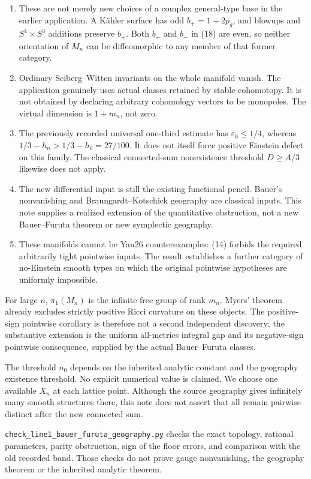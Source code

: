 \documentclass[
  11pt,
]{article}
\providecommand{\tightlist}{%
  \setlength{\itemsep}{0pt}\setlength{\parskip}{0pt}}
\begin{document}
\begin{enumerate}
\def\labelenumi{\arabic{enumi}.}
\tightlist
\item
  These are not merely new choices of a complex general-type base in the
  earlier application. A Kähler surface has odd \(b_+=1+2p_g\), and
  blowups and \(S^1\times S^3\) additions preserve \(b_+\). Both \(b_+\)
  and \(b_-\) in (18) are even, so neither orientation of \(M_n\) can be
  diffeomorphic to any member of that former category.
\item
  Ordinary Seiberg--Witten invariants on the whole manifold vanish. The
  application genuinely uses actual classes retained by stable
  cohomotopy. It is not obtained by declaring arbitrary cohomology
  vectors to be monopoles. The virtual dimension is \(1+m_n\), not zero.
\item
  The previously recorded universal one-third estimate has
  \(\varepsilon_0\le1/4\), whereas \(1/3-h_n>1/3-h_0=27/100\). It does
  not itself force positive Einstein defect on this family. The
  classical connected-sum nonexistence threshold \(D\ge A/3\) likewise
  does not apply.
\item
  The new differential input is still the existing functional pencil.
  Bauer's nonvanishing and Braungardt--Kotschick geography are classical
  inputs. This note supplies a realized extension of the quantitative
  obstruction, not a new Bauer--Furuta theorem or new symplectic
  geography.
\item
  These manifolds cannot be Yau26 counterexamples: (14) forbids the
  required arbitrarily tight pointwise inputs. The result establishes a
  further category of no-Einstein smooth types on which the original
  pointwise hypotheses are uniformly impossible.
\end{enumerate}

For large \(n\), \(\pi_1(M_n)\) is the infinite free group of rank
\(m_n\). Myers' theorem already excludes strictly positive Ricci
curvature on these objects. The positive-sign pointwise corollary is
therefore not a second independent discovery; the substantive extension
is the uniform all-metrics integral gap and its negative-sign pointwise
consequence, supplied by the actual Bauer--Furuta classes.

The threshold \(n_0\) depends on the inherited analytic constant and the
geography existence threshold. No explicit numerical value is claimed.
We choose one available \(X_n\) at each lattice point. Although the
source geography gives infinitely many smooth structures there, this
note does not assert that all remain pairwise distinct after the new
connected sum.

\texttt{check\_line1\_bauer\_furuta\_geography.py} checks the exact
topology, rational parameters, parity obstruction, sign of the floor
errors, and comparison with the old recorded band. Those checks do not
prove gauge nonvanishing, the geography theorem or the inherited
analytic theorem.
\end{document}
